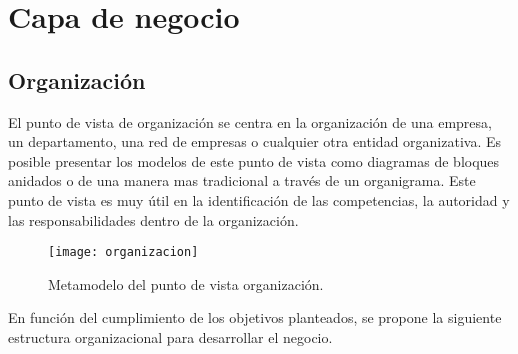 
\chapter{Capa de negocio}


\section{Organización}

El punto de vista de organización se centra en la organización de una empresa, un departamento, una red de empresas o cualquier otra entidad organizativa. Es posible presentar los modelos de este punto de vista como diagramas de bloques anidados o de una manera mas tradicional a través de un organigrama. Este punto de vista es muy útil en la identificación de las competencias, la autoridad y las responsabilidades dentro de la organización. 


\begin{figure}[h]
\centering
\texttt{[image: organizacion]}
\caption{Metamodelo del punto de vista organización.}
\end{figure}

En función del cumplimiento de los objetivos planteados, se propone la siguiente estructura organizacional para desarrollar el negocio.

